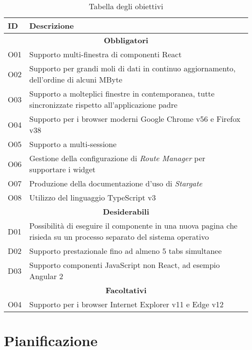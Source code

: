 \begin{table}[H]
\small
\begin{tabular}{ |p{2cm} |p{11cm}|}
\hline
\textbf{ID} & \textbf{Descrizione} \\ \hline

\multicolumn{2}{|c|}{\textbf{Obbligatori}} \\ \hline

O01 & Supporto multi-finestra di componenti React \\ \hline
O02 & Supporto per grandi moli di dati in continuo aggiornamento, dell'ordine di alcuni MByte \\ \hline
O03 & Supporto a molteplici finestre in contemporanea, tutte sincronizzate rispetto all'applicazione padre \\ \hline
O04 & Supporto per i browser moderni Google Chrome v56 e Firefox v38 \\ \hline
O05 & Supporto a multi-sessione \\ \hline
O06 & Gestione della configurazione di \textit{Route Manager} per supportare i widget \\ \hline
O07 & Produzione della documentazione d'uso di \textit{Stargate} \\ \hline
O08 & Utilizzo del linguaggio TypeScript v3 \\ \hline

\multicolumn{2}{|c|}{\textbf{Desiderabili}} \\ \hline

D01 & Possibilità di eseguire il componente in una nuova pagina che risieda su un processo separato del sistema operativo \\ \hline
D02 & Supporto prestazionale fino ad almeno 5 tabs simultanee \\ \hline
D03 & Supporto componenti JavaScript non React, ad esempio Angular 2 \\ \hline

\multicolumn{2}{|c|}{\textbf{Facoltativi}} \\ \hline

O04 & Supporto per i browser Internet Explorer v11 e Edge v12 \\ \hline

\end{tabular}
\caption{Tabella degli obiettivi}
\end{table}

\section{Pianificazione}

